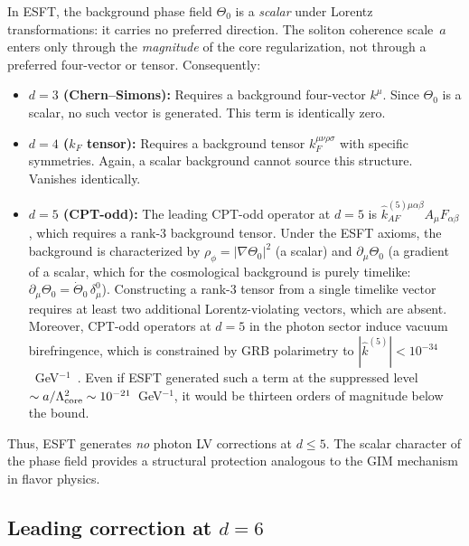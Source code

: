 ﻿\documentclass[a4paper,12pt]{article}
\begin{document}
In ESFT, the background phase field $\Theta_0$ is a \emph{scalar}
under Lorentz transformations: it carries no preferred direction.  The
soliton coherence scale~$a$ enters only through the \emph{magnitude}
of the core regularization, not through a preferred four-vector or
tensor.  Consequently:
\begin{itemize}
  \item \textbf{$d=3$ (Chern--Simons):} Requires a background
    four-vector $k^\mu$.  Since $\Theta_0$ is a scalar, no such vector
    is generated.  This term is identically zero.
  \item \textbf{$d=4$ ($k_F$ tensor):} Requires a background tensor
    $k_F^{\mu\nu\rho\sigma}$ with specific symmetries.  Again, a scalar
    background cannot source this structure.  Vanishes identically.
  \item \textbf{$d=5$ (CPT-odd):} The leading CPT-odd operator at $d=5$
    is $\hat{k}_{AF}^{(5)\mu\alpha\beta} A_\mu F_{\alpha\beta}$, which
    requires a rank-3 background tensor.  Under the ESFT axioms, the
    background is characterized by $\rho_\phi = |\nabla\Theta_0|^2$
    (a scalar) and $\partial_\mu\Theta_0$ (a gradient of a scalar, which
    for the cosmological background is purely timelike:
    $\partial_\mu\Theta_0 = \dot\Theta_0\,\delta_\mu^0$).  Constructing
    a rank-3 tensor from a single timelike vector requires at least
    two additional Lorentz-violating vectors, which are absent.
    Moreover, CPT-odd operators at $d=5$ in the photon sector induce
    vacuum birefringence, which is constrained by GRB polarimetry to
    $|\hat{k}^{(5)}| < 10^{-34}$~GeV$^{-1}$~\cite{Kostelecky2009,
    Kislat2015}.  Even if ESFT generated such a term at the suppressed
    level $\sim a/\Lambda_{\rm core}^2 \sim 10^{-21}$~GeV$^{-1}$, it
    would be thirteen orders of magnitude below the bound.
\end{itemize}

Thus, ESFT generates \emph{no} photon LV corrections at $d\leq 5$.
The scalar character of the phase field provides a structural
protection analogous to the GIM mechanism in flavor physics.

\subsection{Leading correction at $d=6$}
\end{document}
